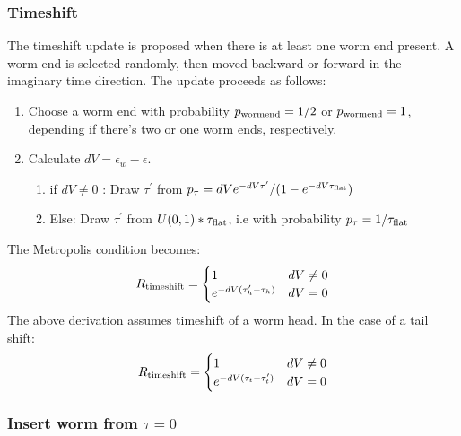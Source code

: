\documentclass[12pt, two sided]{article}
\begin{document}
    \subsubsection{Timeshift}
    The timeshift update is proposed when there is at least one worm end present. A worm end is selected randomly, then moved backward or forward in the imaginary time direction. The update proceeds as follows:
    \begin{enumerate}
    \item{Choose a worm end with probability $p_{\rm{wormend}}=1/2$ or $p_{\rm{wormend}}=1$, depending if there's two or one worm ends, respectively.}
    \item{Calculate $dV=\epsilon_{w}-\epsilon$.}
    \begin{enumerate}
    \item{if $dV \neq 0$ : Draw $\tau^\prime$ from $p_{\tau} = dV e^{-dV\tau^\prime}/(1-e^{-dV \tau_{\rm{flat}}})$}
    \item{Else: Draw $\tau^\prime$ from $U(0,1)*\tau_{\rm{flat}}$, i.e with probability $p_{\tau} = 1/{\tau_{\rm{flat}}}$}
    \end{enumerate}
    \end{enumerate}
    
    The Metropolis condition becomes:
    \begin{equation}
    R_{\rm{timeshift}} =
    \begin{cases}
    1 & dV\neq0 \\
    e^{-dV (\tau_h^\prime - \tau_h)} & dV=0
    \end{cases}
    \end{equation}
    The above derivation assumes timeshift of a worm head. In the case of a tail shift:
    \begin{equation}
    R_{\rm{timeshift}} =
    \begin{cases}
    1 & dV\neq0 \\
    e^{-dV (\tau_t- \tau_t^\prime)} & dV=0
    \end{cases}
    \end{equation}

    \subsubsection{Insert worm from $\tau=0$}
    
\end{document}
